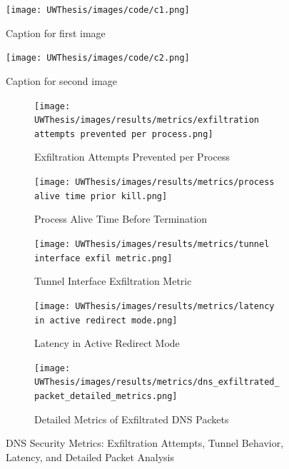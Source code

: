\documentclass [11pt, proquest] {uwthesis}[2020/02/24]
\begin{document}
\begin{figure}[H]
    \centering
    \begin{minipage}{0.48\textwidth}
        \centering
        \texttt{[image: UWThesis/images/code/c1.png]}        \caption{Caption for first image}
        \label{fig:c1}
    \end{minipage}
    \hfill
    \begin{minipage}{0.48\textwidth}
        \centering
        \texttt{[image: UWThesis/images/code/c2.png]}
        \caption{Caption for second image}
        \label{fig:c2}
    \end{minipage}
\end{figure}


\begin{figure}[H]
  \centering

  \begin{subfigure}[b]{0.48\textwidth}
    \texttt{[image: UWThesis/images/results/metrics/exfiltration attempts prevented per process.png]}
    \caption{Exfiltration Attempts Prevented per Process}
  \end{subfigure}
  \hfill
  \begin{subfigure}[b]{0.48\textwidth}
    \texttt{[image: UWThesis/images/results/metrics/process alive time prior kill.png]}
    \caption{Process Alive Time Before Termination}
  \end{subfigure}

  \vspace{0.5cm}

  \begin{subfigure}[b]{0.48\textwidth}
    \texttt{[image: UWThesis/images/results/metrics/tunnel interface exfil metric.png]}
    \caption{Tunnel Interface Exfiltration Metric}
  \end{subfigure}
  \hfill
  \begin{subfigure}[b]{0.48\textwidth}
    \texttt{[image: UWThesis/images/results/metrics/latency in active redirect mode.png]}
    \caption{Latency in Active Redirect Mode}
  \end{subfigure}

  \vspace{0.8cm}

  \begin{subfigure}[b]{0.98\textwidth}
    \centering
    \texttt{[image: UWThesis/images/results/metrics/dns\_exfiltrated\_packet\_detailed\_metrics.png]}
    \caption{Detailed Metrics of Exfiltrated DNS Packets}
  \end{subfigure}

  \caption{DNS Security Metrics: Exfiltration Attempts, Tunnel Behavior, Latency, and Detailed Packet Analysis}
\end{figure}



 


\end{document}
